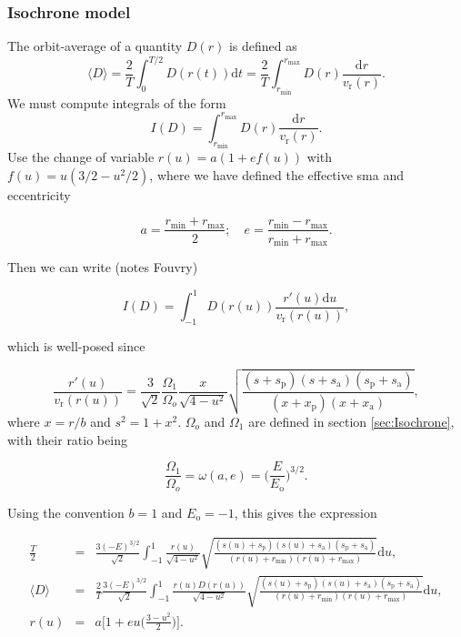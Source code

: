 \documentclass[11pt]{article}
\newcommand{\rr}{\mathrm{r}}
\newcommand{\ro}{\mathrm{o}}
\newcommand{\ra}{\mathrm{a}}
\newcommand{\rp}{\mathrm{p}}
\newcommand{\Eo}{E_{\ro}}
\newcommand{\vr}{v_{\rr}}
\newcommand{\rd}{{\mathrm{d}}}
\newcommand{\rmax}{r_{\max}}
\newcommand{\rmin}{r_{\min}}
\newcommand{\xa}{x_{\ra}}
\newcommand{\xrp}{x_{\rp}}
\newcommand{\sa}{s_{\ra}}
\newcommand{\srp}{s_{\rp}}
\begin{document}
\subsubsection{Isochrone model}
\label{subsubsec:IsochroneOrbitStudy}

The orbit-average of a quantity $D(r)$ is defined as
$$\langle D\rangle = \frac{2}{T} \int_{0}^{T/2} D(r(t)) \rd t = \frac{2}{T} \int_{\rmin}^{\rmax} D(r) \frac{\rd r}{\vr(r)} .$$
We must compute integrals of the form
$$I(D) = \int_{\rmin}^{\rmax} D(r) \frac{\rd r}{\vr(r)} .$$
Use the change of variable $r(u)=a(1+ef(u))$ with $f(u)=u(3/2-u^{2}/2)$, where we have defined the effective sma and eccentricity

\begin{equation}
  a=\frac{\rmin+\rmax}{2};\quad e = \frac{\rmin-\rmax}{\rmin+\rmax} .
  \label{eq:effective_e_a_Iso}
\end{equation}

Then we can write (notes Fouvry)

\begin{equation}
  I(D) = \int_{-1}^{1} D(r(u)) \frac{ r'(u) \rd u}{\vr(r(u))} ,
  \label{eq:Iso_chg_var_eff_anomaly}
\end{equation}

which is well-posed since

\begin{equation}
   \frac{ r'(u) }{\vr(r(u))} = \frac{3}{\sqrt{2}} \frac{\Omega_{1}}{\Omega_{o}} \frac{x}{\sqrt{4-u^{2}}} \sqrt{\frac{(s+\srp)(s+\sa)(\srp+\sa)}{(x+\xrp)(x+\xa)} } ,
  \label{eq:dThdu_Iso}
\end{equation}
where $x=r/b$ and $s^{2}=1+x^{2}$. $\Omega_{o}$ and $\Omega_{1}$ are defined in section \ref{sec:Isochrone}, with their ratio being

$$  \frac{\Omega_{1}}{\Omega_{o}} = \omega(a,e) = \bigg(\frac{E}{\Eo}\bigg)^{3/2} .$$

Using the convention $b=1$ and $\Eo=-1$, this gives the expression

\begin{equation}
  \boxed{
    \begin{array}{ccl}
      \displaystyle{\frac{T}{2}} &=&  \displaystyle{\frac{3 (-E)^{3/2}}{\sqrt{2}} \int_{-1}^{1} \frac{r(u) }{\sqrt{4-u^{2}}} \sqrt{\frac{(s(u)+\srp)(s(u)+\sa)(\srp+\sa)}{(r(u)+\rmin)(r(u)+\rmax)} }  \rd u ,} \\
    \langle D \rangle &=&  \displaystyle{\frac{2}{T}\frac{3 (-E)^{3/2}}{\sqrt{2}} \int_{-1}^{1} \frac{r(u)  D(r(u))}{\sqrt{4-u^{2}}} \sqrt{\frac{(s(u)+\srp)(s(u)+\sa)(\srp+\sa)}{(r(u)+\rmin)(r(u)+\rmax)} }  \rd u ,} \\
    r(u) &=& \displaystyle{a\bigg[1+e u\bigg(\frac{3-u^{2}}{2}\bigg)\bigg] .}
  \end{array}
  }
  \label{eq:Iso_chg_var_eff_anomaly_normalizedUnits}
\end{equation}
\end{document}
